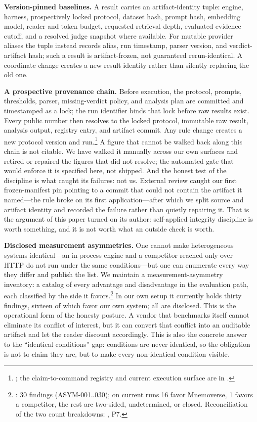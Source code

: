 \documentclass[11pt]{article}
\begin{document}
\textbf{Version-pinned baselines.} A result carries an artifact-identity tuple: engine, harness, prospectively locked protocol, dataset hash, prompt hash, embedding model, reader and token budget, requested retrieval depth, evaluated evidence cutoff, and a resolved judge snapshot where available. For mutable provider aliases the tuple instead records alias, run timestamp, parser version, and verdict-artifact hash; such a result is artifact-frozen, not guaranteed rerun-identical. A coordinate change creates a new result identity rather than silently replacing the old one.

\textbf{A prospective provenance chain.} Before execution, the protocol, prompts, thresholds, parser, missing-verdict policy, and analysis plan are committed and timestamped as a lock; the run identifier binds that lock before raw results exist. Every public number then resolves to the locked protocol, immutable raw result, analysis output, registry entry, and artifact commit. Any rule change creates a new protocol version and run.\footnote{; the claim-to-command registry and current execution surface are in .} A figure that cannot be walked back along this chain is not citable. We have walked it manually across our own surfaces and retired or repaired the figures that did not resolve; the automated gate that would enforce it is specified here, not shipped. And the honest test of the discipline is what caught its failures: not us. External review caught our first frozen-manifest pin pointing to a commit that could not contain the artifact it named---the rule broke on its first application---after which we split source and artifact identity and recorded the failure rather than quietly repairing it. That is the argument of this paper turned on its author: self-applied integrity discipline is worth something, and it is not worth what an outside check is worth.

\textbf{Disclosed measurement asymmetries.} One cannot make heterogeneous systems identical---an in-process engine and a competitor reached only over HTTP do not run under the same conditions---but one can enumerate every way they differ and publish the list. We maintain a measurement-asymmetry inventory: a catalog of every advantage and disadvantage in the evaluation path, each classified by the side it favors.\footnote{: 30 findings (ASYM-001..030); on current runs 16 favor Mnemoverse, 1 favors a competitor, the rest are two-sided, undetermined, or closed. Reconciliation of the two count breakdowns: , P7.} In our own setup it currently holds thirty findings, sixteen of which favor our own system; all are disclosed. This is the operational form of the honesty posture. A vendor that benchmarks itself cannot eliminate its conflict of interest, but it can convert that conflict into an auditable artifact and let the reader discount accordingly. This is also the concrete answer to the ``identical conditions'' gap: conditions are never identical, so the obligation is not to claim they are, but to make every non-identical condition visible.
\end{document}
